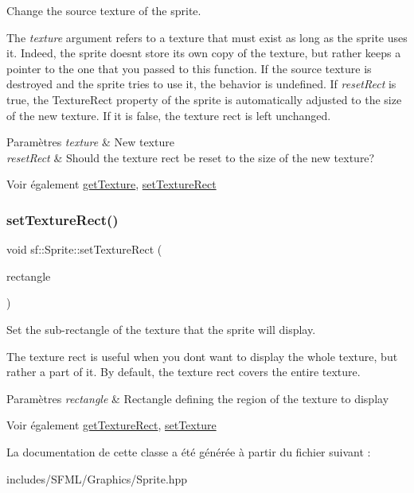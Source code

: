 Change the source texture of the sprite. 

The {\itshape texture} argument refers to a texture that must exist as long as the sprite uses it. Indeed, the sprite doesn\textquotesingle{}t store its own copy of the texture, but rather keeps a pointer to the one that you passed to this function. If the source texture is destroyed and the sprite tries to use it, the behavior is undefined. If {\itshape reset\+Rect} is true, the Texture\+Rect property of the sprite is automatically adjusted to the size of the new texture. If it is false, the texture rect is left unchanged.


\begin{DoxyParams}{Paramètres}
{\em texture} & New texture \\
\hline
{\em reset\+Rect} & Should the texture rect be reset to the size of the new texture?\\
\hline
\end{DoxyParams}
\begin{DoxySeeAlso}{Voir également}
\hyperlink{classsf_1_1Sprite_a1a76155146c8ff37c4eb5a306b4e9ebe}{get\+Texture}, \hyperlink{classsf_1_1Sprite_a3fefec419a4e6a90c0fd54c793d82ec2}{set\+Texture\+Rect} 
\end{DoxySeeAlso}
\mbox{\label{classsf_1_1Sprite_a3fefec419a4e6a90c0fd54c793d82ec2}} 
\subsubsection{\texorpdfstring{set\+Texture\+Rect()}{setTextureRect()}}
{\footnotesize\ttfamily void sf\+::\+Sprite\+::set\+Texture\+Rect (\begin{DoxyParamCaption}\item[{const \hyperlink{classsf_1_1Rect}{Int\+Rect} \&}]{rectangle }\end{DoxyParamCaption})}



Set the sub-\/rectangle of the texture that the sprite will display. 

The texture rect is useful when you don\textquotesingle{}t want to display the whole texture, but rather a part of it. By default, the texture rect covers the entire texture.


\begin{DoxyParams}{Paramètres}
{\em rectangle} & Rectangle defining the region of the texture to display\\
\hline
\end{DoxyParams}
\begin{DoxySeeAlso}{Voir également}
\hyperlink{classsf_1_1Sprite_a3492896fe7b63f58ae022c5b8bec5c98}{get\+Texture\+Rect}, \hyperlink{classsf_1_1Sprite_a3729c88d88ac38c19317c18e87242560}{set\+Texture} 
\end{DoxySeeAlso}


La documentation de cette classe a été générée à partir du fichier suivant \+:\begin{DoxyCompactItemize}
\item 
includes/\+S\+F\+M\+L/\+Graphics/Sprite.\+hpp\end{DoxyCompactItemize}

